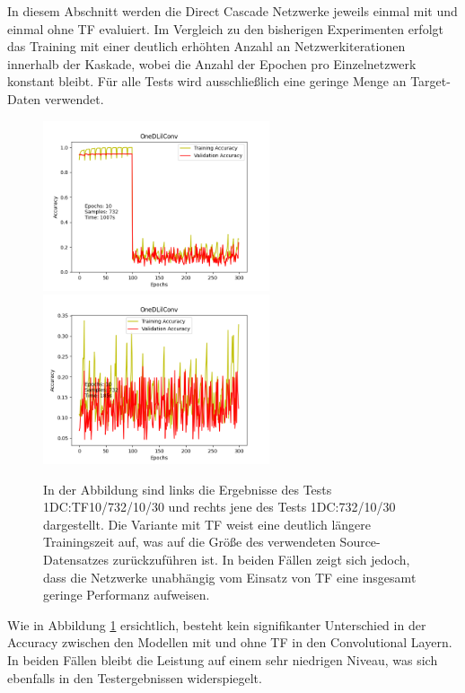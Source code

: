 In diesem Abschnitt werden die Direct Cascade Netzwerke jeweils einmal mit und einmal ohne TF evaluiert. Im Vergleich zu den 
bisherigen Experimenten erfolgt das Training mit einer deutlich erhöhten Anzahl an Netzwerkiterationen innerhalb der Kaskade, wobei die Anzahl der 
Epochen pro Einzelnetzwerk konstant bleibt. Für alle Tests wird ausschließlich eine geringe Menge an Target-Daten verwendet.

\begin{figure}[htpb]
    \includegraphics[height=5cm]{../../Plots/ba_plots/classTF/1dc_tr.png}
    \includegraphics[height=5cm]{../../Plots/ba_plots/classTF/wo1dc_tr.png}
    \caption{\label{fig:1dc_tr} 
    \small{In der Abbildung sind links die Ergebnisse des Tests 1DC:TF10/732/10/30 und rechts jene des Tests 1DC:732/10/30 dargestellt. Die 
    Variante mit TF weist eine deutlich längere Trainingszeit auf, was auf die Größe des verwendeten Source-Datensatzes zurückzuführen ist. In 
    beiden Fällen zeigt sich jedoch, dass die Netzwerke unabhängig vom Einsatz von TF eine insgesamt geringe Performanz aufweisen.}}
\end{figure}

Wie in Abbildung \ref{fig:1dc_tr} ersichtlich, besteht kein signifikanter Unterschied in der Accuracy zwischen den 
Modellen mit und ohne TF in den Convolutional Layern. In beiden Fällen bleibt die Leistung auf einem sehr niedrigen Niveau, was 
sich ebenfalls in den Testergebnissen widerspiegelt.

